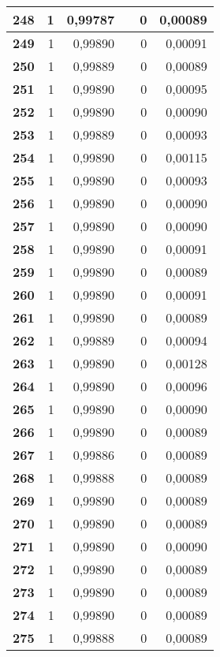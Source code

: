 \begin{longtable}{|r|r|r|l|r|r|}
\textbf{248} & 1 & 0,99787 &  & 0 & 0,00089 \\ \hline
\textbf{249} & 1 & 0,99890 &  & 0 & 0,00091 \\ \hline
\textbf{250} & 1 & 0,99889 &  & 0 & 0,00089 \\ \hline
\textbf{251} & 1 & 0,99890 &  & 0 & 0,00095 \\ \hline
\textbf{252} & 1 & 0,99890 &  & 0 & 0,00090 \\ \hline
\textbf{253} & 1 & 0,99889 &  & 0 & 0,00093 \\ \hline
\textbf{254} & 1 & 0,99890 &  & 0 & 0,00115 \\ \hline
\textbf{255} & 1 & 0,99890 &  & 0 & 0,00093 \\ \hline
\textbf{256} & 1 & 0,99890 &  & 0 & 0,00090 \\ \hline
\textbf{257} & 1 & 0,99890 &  & 0 & 0,00090 \\ \hline
\textbf{258} & 1 & 0,99890 &  & 0 & 0,00091 \\ \hline
\textbf{259} & 1 & 0,99890 &  & 0 & 0,00089 \\ \hline
\textbf{260} & 1 & 0,99890 &  & 0 & 0,00091 \\ \hline
\textbf{261} & 1 & 0,99890 &  & 0 & 0,00089 \\ \hline
\textbf{262} & 1 & 0,99889 &  & 0 & 0,00094 \\ \hline
\textbf{263} & 1 & 0,99890 &  & 0 & 0,00128 \\ \hline
\textbf{264} & 1 & 0,99890 &  & 0 & 0,00096 \\ \hline
\textbf{265} & 1 & 0,99890 &  & 0 & 0,00090 \\ \hline
\textbf{266} & 1 & 0,99890 &  & 0 & 0,00089 \\ \hline
\textbf{267} & 1 & 0,99886 &  & 0 & 0,00089 \\ \hline
\textbf{268} & 1 & 0,99888 &  & 0 & 0,00089 \\ \hline
\textbf{269} & 1 & 0,99890 &  & 0 & 0,00089 \\ \hline
\textbf{270} & 1 & 0,99890 &  & 0 & 0,00089 \\ \hline
\textbf{271} & 1 & 0,99890 &  & 0 & 0,00090 \\ \hline
\textbf{272} & 1 & 0,99890 &  & 0 & 0,00089 \\ \hline
\textbf{273} & 1 & 0,99890 &  & 0 & 0,00089 \\ \hline
\textbf{274} & 1 & 0,99890 &  & 0 & 0,00089 \\ \hline
\textbf{275} & 1 & 0,99888 &  & 0 & 0,00089 \\ \hline

\end{longtable}
